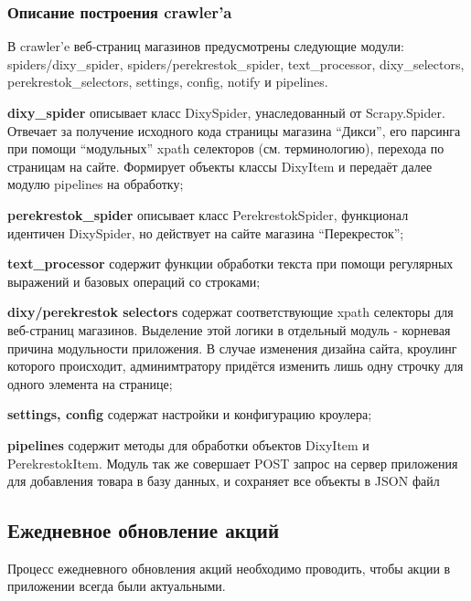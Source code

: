 \subsubsection{Описание построения crawler'a}

В crawler'e веб-страниц магазинов предусмотрены следующие модули:
spiders/dixy\_spider, spiders/perekrestok\_spider, text\_processor,
dixy\_selectors, perekrestok\_selectors, settings, config, notify и pipelines.\\
\begin{my_enumerate}
    \item \textbf{dixy\_spider} описывает класс DixySpider, унаследованный от
        Scrapy.Spider. Отвечает за получение исходного кода страницы магазина
        ``Дикси'', его парсинга при помощи ``модульных'' xpath селекторов (см.
        терминологию), перехода по страницам на сайте. Формирует объекты классы
        DixyItem и передаёт далее модулю pipelines на обработку;
    \item \textbf{perekrestok\_spider} описывает класс PerekrestokSpider,
        функционал идентичен DixySpider, но действует на сайте магазина
        ``Перекресток'';
    \item \textbf{text\_processor} содержит функции обработки текста при помощи
        регулярных выражений и базовых операций со строками;
    \item \textbf{dixy/perekrestok selectors} содержат соответствующие xpath
        селекторы для веб-страниц магазинов. Выделение этой логики в отдельный
        модуль - корневая причина модульности приложения. В случае изменения
        дизайна сайта, кроулинг которого происходит, админимтратору придётся
        изменить лишь одну строчку для одного элемента на странице;
    \item \textbf{settings, config} содержат настройки и конфигурацию кроулера;
    \item \textbf{pipelines} содержит методы для обработки объектов DixyItem и
        PerekrestokItem. Модуль так же совершает POST запрос на сервер
        приложения для добавления товара в базу данных, и сохраняет все объекты
        в JSON файл
\end{my_enumerate}

\subsection{Ежедневное обновление акций}
Процесс ежедневного обновления акций необходимо проводить, чтобы акции в приложении всегда были актуальными.


